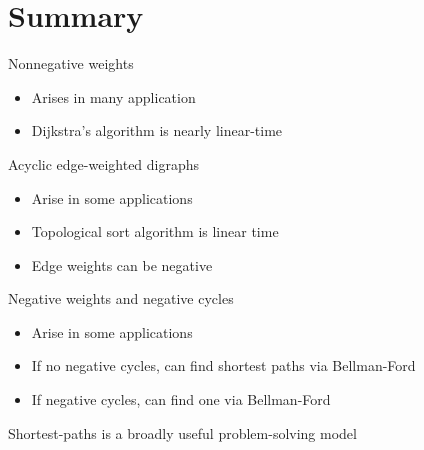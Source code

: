 \documentclass[8pt,a4paper,compress]{beamer}
\begin{document}
\section{Summary}
\begin{frame}[fragile]
Nonnegative weights
\begin{itemize}
\item Arises in many application
\item Dijkstra's algorithm is nearly linear-time
\end{itemize}

\bigskip

Acyclic edge-weighted digraphs
\begin{itemize}
\item Arise in some applications
\item Topological sort algorithm is linear time
\item Edge weights can be negative
\end{itemize}

\bigskip

Negative weights and negative cycles
\begin{itemize}
\item Arise in some applications
\item If no negative cycles, can find shortest paths via Bellman-Ford
\item If negative cycles, can find one via Bellman-Ford
\end{itemize}

\bigskip

Shortest-paths is a broadly useful problem-solving model
\end{frame}
\end{document}
